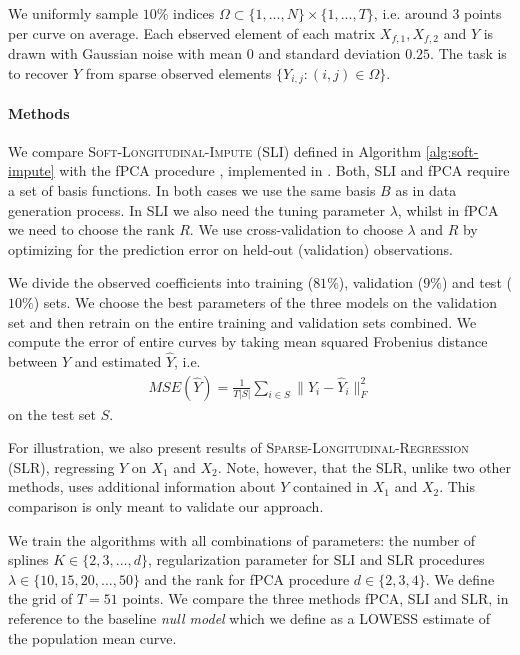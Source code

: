 \documentclass[preprint]{imsart}
\numberwithin{equation}{section}
\theoremstyle{plain}
\begin{document}
We uniformly sample $10\%$ indices $\Omega \subset \{1,...,N\} \times \{1,...,T\}$, i.e. around $3$ points per curve on average. Each ebserved element of each matrix $X_{f,1}, X_{f,2}$ and $Y$ is drawn with Gaussian noise with mean $0$ and standard deviation $0.25$. The task is to recover $Y$ from sparse observed elements $\{Y_{i,j} : (i,j) \in \Omega\}$. 

\paragraph{Methods}

We compare \textsc{Soft-Longitudinal-Impute} (SLI) defined in Algorithm \ref{alg:soft-impute} with the fPCA procedure \citep{james2000principal}, implemented in \citet{peng2009geometric}. Both, SLI and fPCA require a set of basis functions. In both cases we use the same basis $B$ as in data generation process. In SLI we also need the tuning parameter $\lambda$, whilst in fPCA we need to choose the rank $R$. We use cross-validation to choose $\lambda$ and $R$ by optimizing for the prediction error on held-out (validation) observations.

We divide the observed coefficients into training ($81\%$), validation ($9\%$) and test ($10\%$) sets. We choose the best parameters of the three models on the validation set and then retrain on the entire training and validation sets combined. %
We compute the error of entire curves by taking mean squared Frobenius distance between $Y$ and estimated $\hat{Y}$, i.e.
\begin{align}\label{eq:err}
 MSE(\hat{Y}) = \frac{1}{T|S|} \sum_{i\in S} \|Y_i - \hat{Y}_i \|_F^2
\end{align}
 on the test set $S$.
 
 For illustration, we also present results of \textsc{Sparse-Longitudinal-Regression} (SLR), regressing $Y$ on $X_1$ and $X_2$. Note, however, that the SLR, unlike two other methods, uses additional information about $Y$ contained in $X_1$ and $X_2$. This comparison is only meant to validate our approach.

 We train the algorithms with all combinations of parameters: the number of splines $K \in \{2,3,...,d\}$, regularization parameter for SLI and SLR procedures $\lambda \in \{10, 15, 20, ..., 50\}$ and the rank for fPCA procedure $d \in \{2,3,4\}$. We define the grid of $T = 51$ points. We compare the three methods fPCA, SLI and SLR, in reference to the baseline {\it null model} which we define as a LOWESS estimate of the population mean curve.
\end{document}
